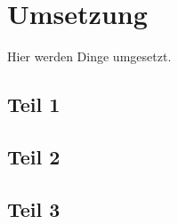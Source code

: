 \section{Umsetzung}
Hier werden Dinge umgesetzt.
\subsection{Teil 1}
\subsection{Teil 2}
\subsection{Teil 3}